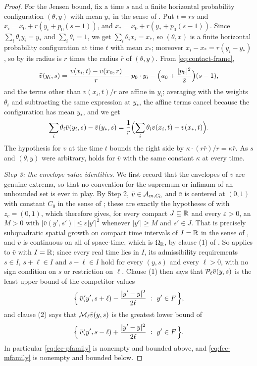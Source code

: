 \begin{proof}
For the Jensen bound, fix a time $s$ and a finite horizontal probability
configuration $(\theta,y)$ with mean $y_*$ in the sense of
. Put $t=rs$ and $x_i=x_0+r(y_i+p_0(s-1))$, and
$x_*=x_0+r(y_*+p_0(s-1))$. Since $\sum_i\theta_iy_i=y_*$ and
$\sum_i\theta_i=1$, we get $\sum_i\theta_ix_i=x_*$, so $(\theta,x)$ is a finite
horizontal probability configuration at time $t$ with mean $x_*$; moreover
$x_i-x_*=r(y_i-y_*)$, so by  its radius is $r$ times the
radius $\bar r$ of $(\theta,y)$. From \eqref{eq:contact-frame},
\[
  \bar v(y_i,s)=\frac{v(x_i,t)-v(x_0,r)}{r}-p_0\cdot y_i
     -\Bigl(a_0+\frac{|p_0|^2}{2}\Bigr)(s-1),
\]
and the terms other than $v(x_i,t)/r$ are affine in $y_i$; averaging with the
weights $\theta_i$ and subtracting the same expression at $y_*$, the affine
terms cancel because the configuration has mean $y_*$, and we get
\begin{equation}\label{eq:fec-defect}
  \sum_i\theta_i\bar v(y_i,s)-\bar v(y_*,s)
   =\frac1r\Bigl(\sum_i\theta_iv(x_i,t)-v(x_*,t)\Bigr).
\end{equation}
The hypothesis  for $v$ at the time $t$ bounds the right
side by $\kappa\cdot(r\bar r)/r=\kappa\bar r$. As $s$ and $(\theta,y)$ were
arbitrary,  holds for $\bar v$ with the same constant
$\kappa$ at every time.

\emph{Step 3: the envelope value identities.}
We first record that the envelopes of $\bar v$ are genuine extrema, so that no
convention for the supremum or infimum of an unbounded set is ever in play. By
Step 2, $\bar v\in\mathcal{A}_{m,C_0}$ and $\bar v$ is centered at $(0,1)$ with
constant $C_0$ in the sense of ; these are exactly the
hypotheses of  with $z_c=(0,1)$, which therefore
gives, for every compact $J\subseteq\mathbb{R}$ and every $\varepsilon>0$, an $M>0$ with
$|\bar v(y',s')|\le\varepsilon|y'|^2$ whenever $|y'|\ge M$ and $s'\in J$. That
is precisely subquadratic spatial growth on compact time intervals of $I=\mathbb{R}$ in
the sense of , and $\bar v$ is continuous on all of
space-time, which is $\Omega_{\mathbb{R}}$, by clause (1) of . So
 applies to $\bar v$ with $I=\mathbb{R}$; since every
real time lies in $I$, its admissibility requirements $s\in I$, $s+\ell\in I$
and $s-\ell\in I$ hold for every $(y,s)$ and every $\ell>0$, with no sign
condition on $s$ or restriction on $\ell$. Clause (1) then says that
$\mathcal{P}_\ell\bar v(y,s)$ is the least upper bound of the competitor values
\begin{equation}\label{eq:fec-pfamily}
  \Bigl\{\,\bar v(y',s+\ell)-\frac{|y'-y|^2}{2\ell}\ :\ y'\in F\,\Bigr\},
\end{equation}
and clause (2) says that $\mathcal{M}_\ell\bar v(y,s)$ is the greatest lower bound of
\begin{equation}\label{eq:fec-mfamily}
  \Bigl\{\,\bar v(y',s-\ell)+\frac{|y'-y|^2}{2\ell}\ :\ y'\in F\,\Bigr\}.
\end{equation}
In particular \eqref{eq:fec-pfamily} is nonempty and bounded above, and
\eqref{eq:fec-mfamily} is nonempty and bounded below.


\end{proof}
